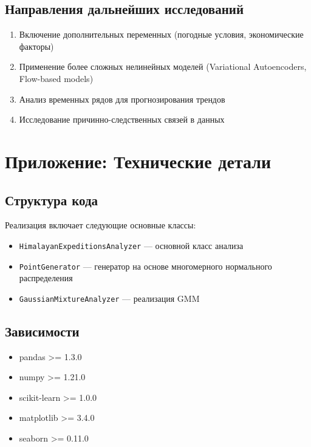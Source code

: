 \documentclass[12pt, a4paper]{article}
\begin{document}
\subsection{Направления дальнейших исследований}
\begin{enumerate}
    \item Включение дополнительных переменных (погодные условия, экономические факторы)
    \item Применение более сложных нелинейных моделей (Variational Autoencoders, Flow-based models)
    \item Анализ временных рядов для прогнозирования трендов
    \item Исследование причинно-следственных связей в данных
\end{enumerate}

\newpage
\appendix
\section{Приложение: Технические детали}
\subsection{Структура кода}
Реализация включает следующие основные классы:
\begin{itemize}
    \item \texttt{HimalayanExpeditionsAnalyzer} --- основной класс анализа
    \item \texttt{PointGenerator} --- генератор на основе многомерного нормального распределения
    \item \texttt{GaussianMixtureAnalyzer} --- реализация GMM
\end{itemize}

\subsection{Зависимости}
\begin{itemize}
    \item pandas >= 1.3.0
    \item numpy >= 1.21.0
    \item scikit-learn >= 1.0.0
    \item matplotlib >= 3.4.0
    \item seaborn >= 0.11.0
\end{itemize}
\end{document}
